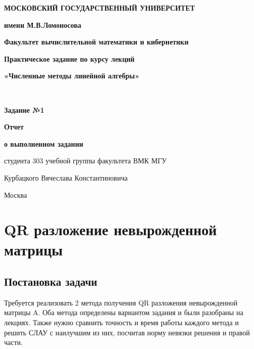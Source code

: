 \documentclass[a4paper,12pt,titlepage,final]{article}
\begin{document}
\begin{titlepage}
\centering\noindent
{
\begin{minipage}{0.1\textwidth}

\end{minipage}
\hfill
\begin{minipage}{0.77\textwidth}
\begin{center}
\textbf{МОСКОВСКИЙ ГОСУДАРСТВЕННЫЙ УНИВЕРСИТЕТ}\par
\textbf{имени М.В.Ломоносова}\par
\end{center}
\end{minipage}
\hfill
\begin{minipage}{0.1\textwidth}

\end{minipage}
}\par
{
\textbf{Факультет вычислительной математики и кибернетики}\par
\nointerlineskip
\noindent\makebox[\linewidth]{\rule{\textwidth}{0.4pt}}
}
\vfill
{
\Large{\textbf{Практическое задание по курсу лекций}}\par
\Large{\textbf{«Численные методы линейной алгебры»}}\par
}\\
{
\Large{\textbf{Задание №1}}\par
}
{
\Large{\textbf{Отчет}}\par
\Large{\textbf{о выполненном задании}}\par
\Large{студента 303 учебной группы факультета ВМК МГУ}\par
\Large{Курбацкого Вячеслава Константиновича}\par
}
\vfill
{\small Москва\\ \the\year{}}
\end{titlepage}
\tableofcontents
\newpage
\section{QR разложение невырожденной матрицы}
\subsection{Постановка задачи}
Требуется реализовать 2 метода получения QR разложения невырожденной матрицы A. Оба метода определены вариантом задания и были разобраны на лекциях. Также нужно сравнить точность и время работы каждого метода и решить СЛАУ с наилучшим из них, посчитав норму невязки решения и правой части.
\end{document}
